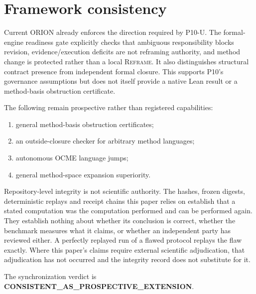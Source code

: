 \section{Framework consistency}
Current ORION already enforces the direction required by P10-U. The formal-engine readiness gate explicitly checks that ambiguous responsibility blocks revision, evidence/execution deficits are not reframing authority, and method change is protected rather than a local \textsc{Reframe}. It also distinguishes structural contract presence from independent formal closure. This supports P10's governance assumptions but does not itself provide a native Lean result or a method-basis obstruction certificate.

The following remain prospective rather than registered capabilities:
\begin{enumerate}
    \item general method-basis obstruction certificates;
    \item an outside-closure checker for arbitrary method languages;
    \item autonomous OCME language jumps;
    \item general method-space expansion superiority.
\end{enumerate}
Repository-level integrity is not scientific authority. The hashes, frozen
digests, deterministic replays and receipt chains this paper relies on establish
that a stated computation was the computation performed and can be performed
again. They establish nothing about whether its conclusion is correct, whether
the benchmark measures what it claims, or whether an independent party has
reviewed either. A perfectly replayed run of a flawed protocol replays the flaw
exactly. Where this paper's claims require external scientific adjudication,
that adjudication has not occurred and the integrity record does not substitute
for it.

The synchronization verdict is \textbf{CONSISTENT\_AS\_PROSPECTIVE\_EXTENSION}.

